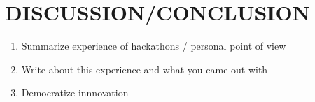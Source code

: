 \section{DISCUSSION/CONCLUSION}

\renewcommand{\labelenumii}{\Roman{enumii}}
\begin{enumerate}

	\item Summarize experience of hackathons / personal point of view
	\item Write about this experience and what you came out with
	\item Democratize innnovation

\end{enumerate}

